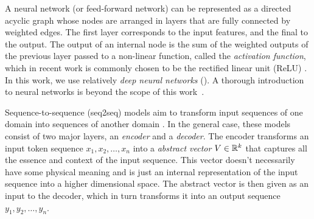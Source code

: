 
A neural network (or feed-forward network) can be represented as a directed
acyclic graph whose nodes are arranged in layers that are fully connected by
weighted edges. The first layer corresponds to the input features, and the final
to the output. The output of an internal node is the sum of the weighted outputs
of the previous layer passed to a non-linear function, called the
\emph{activation function}, which in recent work is commonly chosen to be the
rectified linear unit (ReLU) \citep{Nair2010-xg}. In this work, we use
relatively \emph{deep neural networks} (\dnn). A thorough introduction to neural
networks is beyond the scope of this work~\citep{Hastie2009-bn, Nielsen2015-pu}.


Sequence-to-sequence (seq2seq) models aim to transform input sequences of one
domain into sequences of another domain \citep{Sutskever_2014}. In the general
case, these models consist of two major layers, an \emph{encoder} and a
\emph{decoder}. The encoder transforms an input token sequence $x_1, x_2, \dots,
x_n$ into a \emph{abstract vector} $V \in \mathbb{R}^k$ that captures all the essence
and context of the input sequence. This vector doesn't necessarily have some
physical meaning and is just an internal representation of the input sequence
into a higher dimensional space. The abstract vector is then given as an input
to the decoder, which in turn transforms it into an output sequence $y_1, y_2,
\dots, y_n$.


